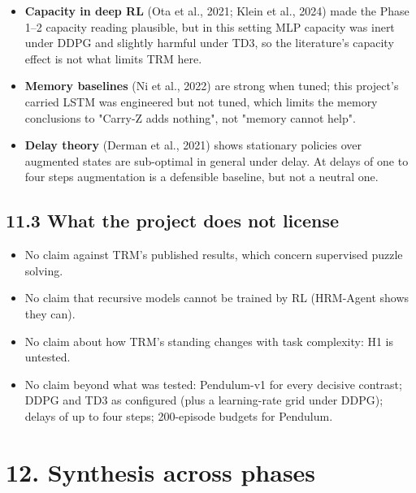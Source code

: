 \documentclass[11pt]{article}
\begin{document}
\begin{itemize}
\item \textbf{Capacity in deep RL} (Ota et al., 2021; Klein et al., 2024) made the Phase 1--2 capacity reading plausible, but in this setting MLP capacity was inert under DDPG and slightly harmful under TD3, so the literature's capacity effect is not what limits TRM here.
\item \textbf{Memory baselines} (Ni et al., 2022) are strong when tuned; this project's carried LSTM was engineered but not tuned, which limits the memory conclusions to "Carry-Z adds nothing", not "memory cannot help".
\item \textbf{Delay theory} (Derman et al., 2021) shows stationary policies over augmented states are sub-optimal in general under delay. At delays of one to four steps augmentation is a defensible baseline, but not a neutral one.
\end{itemize}



\subsection*{11.3 What the project does not license}



\begin{itemize}
\item No claim against TRM's published results, which concern supervised puzzle solving.
\item No claim that recursive models cannot be trained by RL (HRM-Agent shows they can).
\item No claim about how TRM's standing changes with task complexity: H1 is untested.
\item No claim beyond what was tested: Pendulum-v1 for every decisive contrast; DDPG and TD3 as configured (plus a learning-rate grid under DDPG); delays of up to four steps; 200-episode budgets for Pendulum.
\end{itemize}



\medskip



\section*{12. Synthesis across phases}
\end{document}
